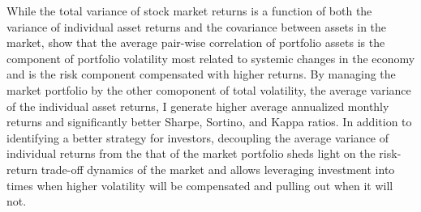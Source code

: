 While the total variance of stock market returns is a function of both the variance of individual asset returns and the covariance between assets in the market, \citet{pollet_average_2010} show that the average pair-wise correlation of portfolio assets is the component of portfolio volatility most related to systemic changes in the economy and is the risk component compensated with higher returns. By managing the market portfolio by the other comoponent of total volatility, the average variance of the individual asset returns, I generate higher average annualized monthly returns and significantly better Sharpe, Sortino, and Kappa ratios. In addition to identifying a better strategy for investors, decoupling the average variance of individual returns from the that of the market portfolio sheds light on the risk-return trade-off dynamics of the market and allows leveraging investment into times when higher volatility will be compensated and pulling out when it will not.   %



